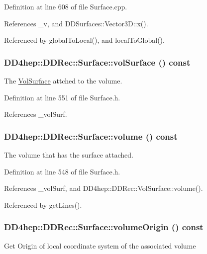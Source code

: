 Definition at line 608 of file Surface.cpp.

References \_\-v, and DDSurfaces::Vector3D::x().

Referenced by globalToLocal(), and localToGlobal().\hypertarget{class_d_d4hep_1_1_d_d_rec_1_1_surface_a4aa8b91c65fcda2f0ce817294d6e127d}{
\subsubsection[{volSurface}]{ DD4hep::DDRec::Surface::volSurface () const}}
\label{class_d_d4hep_1_1_d_d_rec_1_1_surface_a4aa8b91c65fcda2f0ce817294d6e127d}


The \hyperlink{class_d_d4hep_1_1_d_d_rec_1_1_vol_surface}{VolSurface} attched to the volume. 

Definition at line 551 of file Surface.h.

References \_\-volSurf.\hypertarget{class_d_d4hep_1_1_d_d_rec_1_1_surface_a503e338d4d10ef0826b59004e6978d43}{
\subsubsection[{volume}]{ DD4hep::DDRec::Surface::volume () const}}
\label{class_d_d4hep_1_1_d_d_rec_1_1_surface_a503e338d4d10ef0826b59004e6978d43}


The volume that has the surface attached. 

Definition at line 548 of file Surface.h.

References \_\-volSurf, and DD4hep::DDRec::VolSurface::volume().

Referenced by getLines().\hypertarget{class_d_d4hep_1_1_d_d_rec_1_1_surface_ab2b3a468ee678eb76912d659ddf404fc}{
\subsubsection[{volumeOrigin}]{ DD4hep::DDRec::Surface::volumeOrigin () const}}
\label{class_d_d4hep_1_1_d_d_rec_1_1_surface_ab2b3a468ee678eb76912d659ddf404fc}
Get Origin of local coordinate system of the associated volume 

